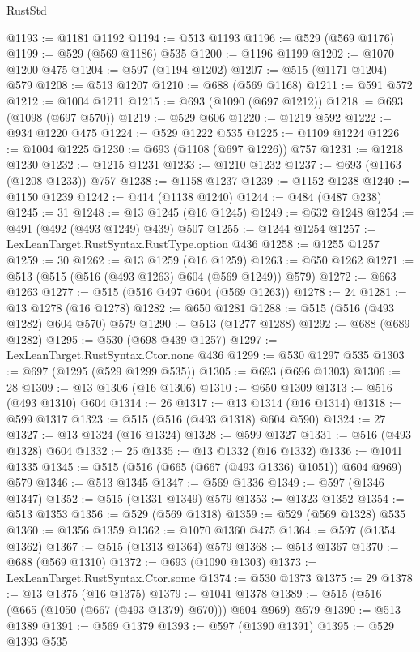 \begin{lexlean}{RustStd}
\begin{coremodule}
@1193 := @1181 @1192
@1194 := @513 @1193
@1196 := @529 (@569 @1176)
@1199 := @529 (@569 @1186) @535
@1200 := @1196 @1199
@1202 := @1070 @1200 @475
@1204 := @597 (@1194 @1202)
@1207 := @515 (@1171 @1204) @579
@1208 := @513 @1207
@1210 := @688 (@569 @1168)
@1211 := @591 @572
@1212 := @1004 @1211
@1215 := @693 (@1090 (@697 @1212))
@1218 := @693 (@1098 (@697 @570))
@1219 := @529 @606
@1220 := @1219 @592
@1222 := @934 @1220 @475
@1224 := @529 @1222 @535
@1225 := @1109 @1224
@1226 := @1004 @1225
@1230 := @693 (@1108 (@697 @1226)) @757
@1231 := @1218 @1230
@1232 := @1215 @1231
@1233 := @1210 @1232
@1237 := @693 (@1163 (@1208 @1233)) @757
@1238 := @1158 @1237
@1239 := @1152 @1238
@1240 := @1150 @1239
@1242 := @414 (@1138 @1240)
@1244 := @484 (@487 @238)
@1245 := 31
@1248 := @13 @1245 (@16 @1245)
@1249 := @632 @1248
@1254 := @491 (@492 (@493 @1249) @439) @507
@1255 := @1244 @1254
@1257 := LexLeanTarget.RustSyntax.RustType.option @436
@1258 := @1255 @1257
@1259 := 30
@1262 := @13 @1259 (@16 @1259)
@1263 := @650 @1262
@1271 := @513 (@515 (@516 (@493 @1263) @604 (@569 @1249)) @579)
@1272 := @663 @1263
@1277 := @515 (@516 @497 @604 (@569 @1263))
@1278 := 24
@1281 := @13 @1278 (@16 @1278)
@1282 := @650 @1281
@1288 := @515 (@516 (@493 @1282) @604 @570) @579
@1290 := @513 (@1277 @1288)
@1292 := @688 (@689 @1282)
@1295 := @530 (@698 @439 @1257)
@1297 := LexLeanTarget.RustSyntax.Ctor.none @436
@1299 := @530 @1297 @535
@1303 := @697 (@1295 (@529 @1299 @535))
@1305 := @693 (@696 @1303)
@1306 := 28
@1309 := @13 @1306 (@16 @1306)
@1310 := @650 @1309
@1313 := @516 (@493 @1310) @604
@1314 := 26
@1317 := @13 @1314 (@16 @1314)
@1318 := @599 @1317
@1323 := @515 (@516 (@493 @1318) @604 @590)
@1324 := 27
@1327 := @13 @1324 (@16 @1324)
@1328 := @599 @1327
@1331 := @516 (@493 @1328) @604
@1332 := 25
@1335 := @13 @1332 (@16 @1332)
@1336 := @1041 @1335
@1345 := @515 (@516 (@665 (@667 (@493 @1336) @1051)) @604 @969) @579
@1346 := @513 @1345
@1347 := @569 @1336
@1349 := @597 (@1346 @1347)
@1352 := @515 (@1331 @1349) @579
@1353 := @1323 @1352
@1354 := @513 @1353
@1356 := @529 (@569 @1318)
@1359 := @529 (@569 @1328) @535
@1360 := @1356 @1359
@1362 := @1070 @1360 @475
@1364 := @597 (@1354 @1362)
@1367 := @515 (@1313 @1364) @579
@1368 := @513 @1367
@1370 := @688 (@569 @1310)
@1372 := @693 (@1090 @1303)
@1373 := LexLeanTarget.RustSyntax.Ctor.some
@1374 := @530 @1373
@1375 := 29
@1378 := @13 @1375 (@16 @1375)
@1379 := @1041 @1378
@1389 := @515 (@516 (@665 (@1050 (@667 (@493 @1379) @670))) @604 @969) @579
@1390 := @513 @1389
@1391 := @569 @1379
@1393 := @597 (@1390 @1391)
@1395 := @529 @1393 @535

\end{coremodule}
\end{lexlean}
